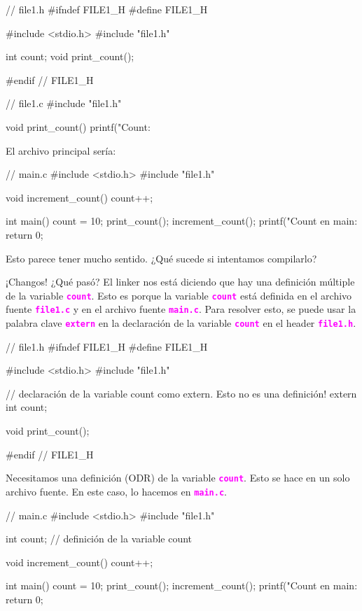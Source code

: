 \documentclass[]{scrartcl}
\newcommand{\hl}[1]{\textcolor{magenta}{\textbf{\texttt{#1}}}}
\begin{document}
\begin{cbox}[]{}
  // file1.h
  #ifndef FILE1_H
  #define FILE1_H

  #include <stdio.h>
  #include "file1.h"

  int count;
  void print_count();

  #endif // FILE1_H
\end{cbox}

\begin{cbox}[]{}
  // file1.c
  #include "file1.h"

  void print_count(){
    printf("Count: %
  }
\end{cbox}

El archivo principal sería:

\begin{cbox}[]{}
  // main.c
  #include <stdio.h>
  #include "file1.h"

  void increment_count() {
    count++;
  }
  
  int main() {
    count = 10;
    print_count();
    increment_count();
    printf("Count en main: %
    return 0;
  }
\end{cbox}

Esto parece tener mucho sentido. ¿Qué sucede si intentamos compilarlo?


¡Changos! ¿Qué pasó? El linker nos está diciendo que hay una definición múltiple de la variable \hl{count}. Esto es porque la variable \hl{count} está definida en el archivo fuente \hl{file1.c} y en el archivo fuente \hl{main.c}. Para resolver esto, se puede usar la palabra clave \hl{extern} en la declaración de la variable \hl{count} en el header \hl{file1.h}.
\begin{cbox}[]{}
  // file1.h
  #ifndef FILE1_H
  #define FILE1_H

  #include <stdio.h>
  #include "file1.h"
  
  // declaración de la variable count como extern. Esto no es una definición!
  extern int count; 

  void print_count();

  #endif // FILE1_H
\end{cbox}

Necesitamos una definición (ODR) de la variable \hl{count}. Esto se hace en un solo archivo fuente. En este caso, lo hacemos en \hl{main.c}.

\begin{cbox}[]{}
  // main.c
  #include <stdio.h>
  #include "file1.h"

  int count; // definición de la variable count

  void increment_count() {
    count++;
  }
  
  int main() {
    count = 10;
    print_count();
    increment_count();
    printf("Count en main: %
    return 0;
  }
\end{cbox}
\end{document}
